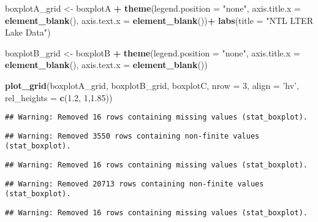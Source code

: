 \documentclass[
]{article}
\newenvironment{Shaded}{\begin{snugshade}}{\end{snugshade}}
\newcommand{\DataTypeTok}[1]{\textcolor[rgb]{0.13,0.29,0.53}{#1}}
\newcommand{\DecValTok}[1]{\textcolor[rgb]{0.00,0.00,0.81}{#1}}
\newcommand{\FloatTok}[1]{\textcolor[rgb]{0.00,0.00,0.81}{#1}}
\newcommand{\KeywordTok}[1]{\textcolor[rgb]{0.13,0.29,0.53}{\textbf{#1}}}
\newcommand{\NormalTok}[1]{#1}
\newcommand{\OperatorTok}[1]{\textcolor[rgb]{0.81,0.36,0.00}{\textbf{#1}}}
\newcommand{\StringTok}[1]{\textcolor[rgb]{0.31,0.60,0.02}{#1}}
\begin{document}
\begin{Shaded}
\begin{Highlighting}[]
\NormalTok{boxplotA_grid <-}\StringTok{ }\NormalTok{boxplotA }\OperatorTok{+}\StringTok{ }
\StringTok{  }\KeywordTok{theme}\NormalTok{(}\DataTypeTok{legend.position =} \StringTok{"none"}\NormalTok{,}
        \DataTypeTok{axis.title.x =} \KeywordTok{element_blank}\NormalTok{(),}
        \DataTypeTok{axis.text.x =} \KeywordTok{element_blank}\NormalTok{())}\OperatorTok{+}
\StringTok{  }\KeywordTok{labs}\NormalTok{(}\DataTypeTok{title =} \StringTok{"NTL LTER Lake Data"}\NormalTok{)}


\NormalTok{boxplotB_grid <-}\StringTok{ }\NormalTok{boxplotB }\OperatorTok{+}
\StringTok{  }\KeywordTok{theme}\NormalTok{(}\DataTypeTok{legend.position =} \StringTok{"none"}\NormalTok{,}
        \DataTypeTok{axis.title.x =} \KeywordTok{element_blank}\NormalTok{(),}
        \DataTypeTok{axis.text.x =} \KeywordTok{element_blank}\NormalTok{())}

\KeywordTok{plot_grid}\NormalTok{(boxplotA_grid, boxplotB_grid, boxplotC, }\DataTypeTok{nrow =} \DecValTok{3}\NormalTok{, }\DataTypeTok{align =} \StringTok{'hv'}\NormalTok{, }
          \DataTypeTok{rel_heights =} \KeywordTok{c}\NormalTok{(}\FloatTok{1.2}\NormalTok{, }\DecValTok{1}\NormalTok{,}\FloatTok{1.85}\NormalTok{))}
\end{Highlighting}
\end{Shaded}

\begin{verbatim}
## Warning: Removed 16 rows containing missing values (stat_boxplot).
\end{verbatim}

\begin{verbatim}
## Warning: Removed 3550 rows containing non-finite values (stat_boxplot).
\end{verbatim}

\begin{verbatim}
## Warning: Removed 16 rows containing missing values (stat_boxplot).
\end{verbatim}

\begin{verbatim}
## Warning: Removed 20713 rows containing non-finite values (stat_boxplot).
\end{verbatim}

\begin{verbatim}
## Warning: Removed 16 rows containing missing values (stat_boxplot).
\end{verbatim}
\end{document}
